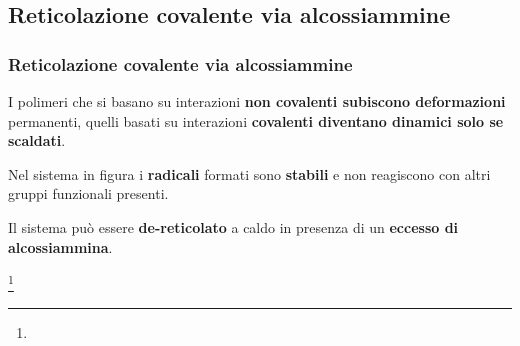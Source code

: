 \subsection{Reticolazione covalente via alcossiammine}
\begin{frame}\frametitle{Reticolazione covalente via alcossiammine}
I polimeri che si basano su interazioni \textbf{non covalenti subiscono deformazioni} permanenti, quelli basati su interazioni \textbf{covalenti diventano dinamici solo se scaldati}.

Nel sistema in figura i \textbf{radicali} formati sono \textbf{stabili} e non reagiscono con altri gruppi funzionali presenti.

Il sistema può essere \textbf{de-reticolato} a caldo in presenza di un \textbf{eccesso di alcossiammina}.
\begin{figure}{}\end{figure}\vspace{-20pt}
\footnote{\tiny  {}}
\end{frame}

